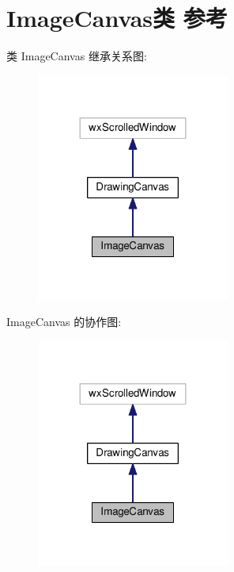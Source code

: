 \hypertarget{class_image_canvas}{\section{Image\+Canvas类 参考}
\label{class_image_canvas}
}


类 Image\+Canvas 继承关系图\+:
\nopagebreak
\begin{figure}[H]
\begin{center}
\leavevmode
\includegraphics[width=180pt]{class_image_canvas__inherit__graph}
\end{center}
\end{figure}


Image\+Canvas 的协作图\+:
\nopagebreak
\begin{figure}[H]
\begin{center}
\leavevmode
\includegraphics[width=180pt]{class_image_canvas__coll__graph}
\end{center}
\end{figure}
